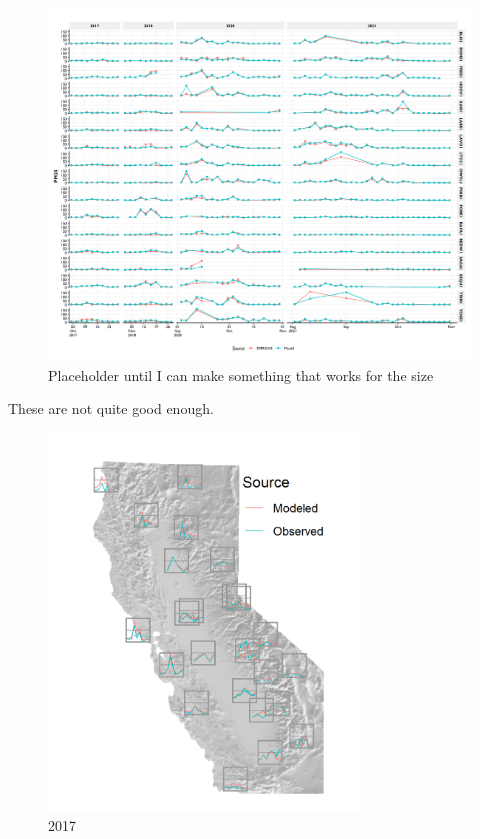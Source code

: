 \documentclass[gmd, manuscript]{copernicus}
\begin{document}
\begin{figure}
\includegraphics[width=12cm]{./Figures/ImpTimeSeries} \caption{Placeholder until I can make something that works for the size}\label{fig:unnamed-chunk-4}
\end{figure}

These are not quite good enough.

\begin{figure}
\includegraphics[width=8.3cm]{./Figures/Spark2017_GMD} \caption{2017}\label{fig:unnamed-chunk-5}
\end{figure}
\end{document}
